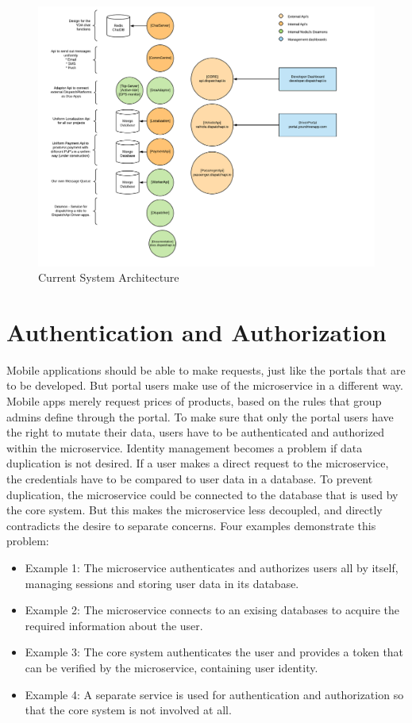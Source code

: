 \begin{figure}[ht!]
	\centering
	\includegraphics[width=1\textwidth]{Architecture}
	\caption[Architecture]{Current System Architecture}
	\label{fig:Architecture}
\end{figure}
\clearpage


\section{Authentication and Authorization}

Mobile applications should be able to make requests, just like the portals that are to be developed. But portal users make use of the microservice in a different way. Mobile apps merely request prices of products, based on the rules that group admins define through the portal. To make sure that only the portal users have the right to mutate their data, users have to be authenticated and authorized within the microservice. Identity management becomes a problem if data duplication is not desired. If a user makes a direct request to the microservice, the credentials have to be compared to user data in a database. To prevent duplication, the microservice could be connected to the database that is used by the core system. But this makes the microservice less decoupled, and directly contradicts the desire to separate concerns. Four examples demonstrate this problem:

\begin{itemize}
	\item Example 1: The microservice authenticates and authorizes users all by itself, managing sessions and storing user data in its database.
	\item Example 2: The microservice connects to an exising databases to acquire the required information about the user.
	\item Example 3: The core system authenticates the user and provides a token that can be verified by the microservice, containing user identity.
	\item Example 4: A separate service is used for authentication and authorization so that the core system is not involved at all.
\end{itemize}

